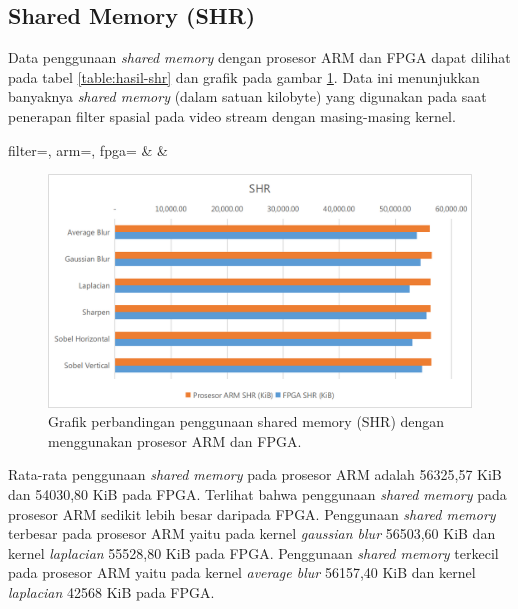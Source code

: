 \subsection{Shared Memory (SHR)}
Data penggunaan \textit{shared memory} dengan prosesor ARM dan FPGA dapat dilihat pada tabel \ref{table:hasil-shr} dan grafik pada gambar \ref{fig:chart-shr}. Data ini menunjukkan banyaknya \textit{shared memory} (dalam satuan kilobyte) yang digunakan pada saat penerapan filter spasial pada video stream dengan masing-masing kernel.
\begin{atable}
    \caption{Tabel perbandingan penggunaan shared memory (SHR) dengan menggunakan prosesor ARM dan FPGA.}
    \label{table:hasil-shr}
        {
            filter=\filter, 
            arm=\arm, 
            fpga=\fpga}
        {
            \filter & 
            \arm & 
            \fpga }
\end{atable}
\begin{figure}[H]
    \includegraphics[width=0.81\linewidth, center]{images/chart/chart-shr.png}
    \caption{Grafik perbandingan penggunaan shared memory (SHR) dengan menggunakan prosesor ARM dan FPGA.}
    \label{fig:chart-shr}
\end{figure}
Rata-rata penggunaan \textit{shared memory} pada prosesor ARM adalah 56325,57 KiB dan 54030,80 KiB pada FPGA. Terlihat bahwa penggunaan \textit{shared memory} pada prosesor ARM sedikit lebih besar daripada FPGA. Penggunaan \textit{shared memory} terbesar pada prosesor ARM yaitu pada kernel \textit{gaussian blur} 56503,60 KiB dan kernel \textit{laplacian} 55528,80 KiB pada FPGA. Penggunaan \textit{shared memory} terkecil pada prosesor ARM yaitu pada kernel \textit{average blur} 56157,40 KiB dan kernel \textit{laplacian} 42568 KiB pada FPGA.

